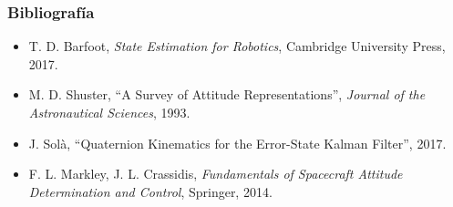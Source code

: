 \documentclass[11pt]{beamer}
\begin{document}

\begin{frame}
\frametitle{Bibliografía}

\small
\begin{itemize}
  \item T. D. Barfoot, \emph{State Estimation for Robotics}, Cambridge University Press, 2017.
  \item M. D. Shuster, ``A Survey of Attitude Representations'', \emph{Journal of the Astronautical Sciences}, 1993.
  \item J. Solà, ``Quaternion Kinematics for the Error-State Kalman Filter'', 2017.
  \item F. L. Markley, J. L. Crassidis, \emph{Fundamentals of Spacecraft Attitude Determination and Control}, Springer, 2014.
\end{itemize}
\end{frame}



\end{document}
